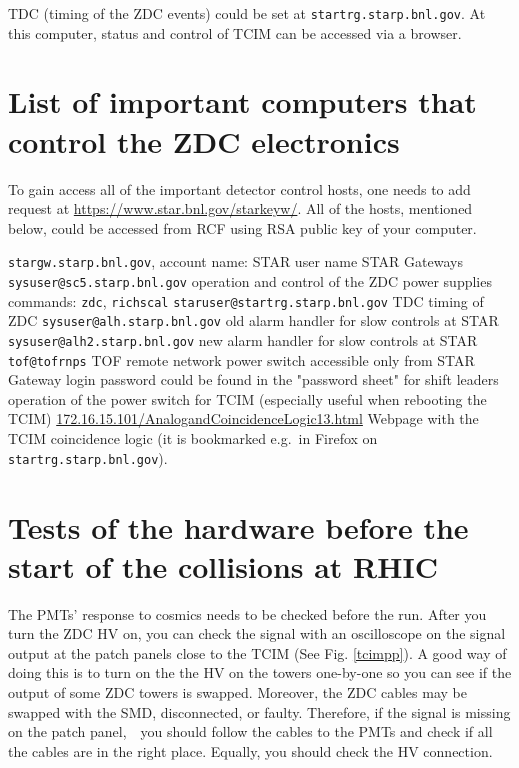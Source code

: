 TDC (timing of the ZDC events) could be set at \texttt{startrg.starp.bnl.gov}. At this computer, status and control of TCIM can be accessed via a browser.

\section{List of important computers that control the ZDC electronics}

To gain access all of the important detector control hosts, one needs to add request at \url{https://www.star.bnl.gov/starkeyw/}. All of the hosts, mentioned below, could be accessed from RCF using RSA public key of your computer.
\begin{outline}
 \1 \texttt{stargw.starp.bnl.gov}, account name: STAR user name
   \2 STAR Gateways
 \1 \texttt{sysuser@sc5.starp.bnl.gov} 
   \2 operation and control of the ZDC power supplies
   \2 commands: \texttt{zdc}, \texttt{richscal}
 \1 \texttt{staruser@startrg.starp.bnl.gov}
   \2 TDC timing of ZDC
 \1 \texttt{sysuser@alh.starp.bnl.gov} 
   \2 old alarm handler for slow controls at STAR
 \1 \texttt{sysuser@alh2.starp.bnl.gov}
   \2 new alarm handler for slow controls at STAR
 \1 \texttt{tof@tofrnps}
   \2 TOF remote network power switch
   \2 accessible only from STAR Gateway
   \2 login password could be found in the "password sheet" for shift leaders
   \2 operation of the power switch for TCIM (especially useful when rebooting the TCIM)
 \1 \url{172.16.15.101/AnalogandCoincidenceLogic13.html}
   \2 Webpage with the TCIM coincidence logic (it is bookmarked e.g.\ in Firefox on \texttt{startrg.starp.bnl.gov}).
\end{outline}
 
\section{Tests of the hardware before the start of the collisions at RHIC}
The PMTs' response to cosmics needs to be checked before the run. After you turn the ZDC HV on, you can check the signal with an oscilloscope on the signal output at the patch panels close to the TCIM (See Fig. \ref{tcimpp}). A good way of doing this is to turn on the the HV on the towers one-by-one so you can see if the output of some ZDC towers is swapped.
Moreover, the ZDC cables may be swapped with the SMD, disconnected, or faulty. Therefore, if the signal is missing on the patch panel,　you should follow the cables to the PMTs and check if all the cables are in the right place. Equally, you should check the HV connection.

